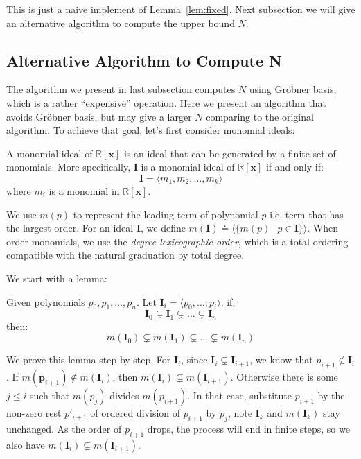 \documentclass{jssc}
\begin{document}
This is just a naive implement of Lemma~\ref{lem:fixed}. Next subsection we will give an alternative algorithm to compute the upper bound $N$.

\subsection{Alternative Algorithm to Compute N}
\label{sub:alternative}
The algorithm we present in last subsection computes $N$ using Gr\"{o}bner basis, which is a rather ``expensive'' operation. Here we present an algorithm that avoids Gr\"{o}bner basis, but may give a larger $N$ comparing to the original algorithm. To achieve that goal, let's first consider monomial ideals:

\begin{definition}
\label{def:monomialIdeal}
A monomial ideal of $\mathbb{R}[\boldsymbol{x}]$ is an ideal that can be generated by a finite set of monomials. More specifically, $\boldsymbol{I}$ is a monomial ideal of $\mathbb{R}[\boldsymbol{x}]$ if and only if:
\begin{displaymath}
	\boldsymbol{I} = \langle m_1, m_2, \dots, m_k \rangle
\end{displaymath}
where $m_i$ is a monomial in $\mathbb{R}[\boldsymbol{x}]$.
\end{definition}

We use $m(p)$ to represent the leading term of polynomial $p$ i.e. term that has the largest order. For an ideal $\boldsymbol{I}$, we define $m(\boldsymbol{I}) \doteq \langle \{m(p)\ |\ p \in \boldsymbol{I} \} \rangle$. When order monomials, we use the \emph{degree-lexicographic order}, which is a total ordering compatible with the natural graduation by total degree.

We start with a lemma:

\begin{lemma}
\label{lem:monomialChain}
Given polynomials $p_0, p_1, \dots, p_n$. Let $\boldsymbol{I}_i = \langle p_0, \dots, p_i \rangle$. if:
	\begin{equation*}
		\boldsymbol{I}_0 \subsetneq \boldsymbol{I}_1 \subsetneq \dots \subsetneq \boldsymbol{I}_n
	\end{equation*}
then:
	\begin{equation*}
		m(\boldsymbol{I}_0) \subsetneq m(\boldsymbol{I}_1) \subsetneq \dots \subsetneq m(\boldsymbol{I}_n)
	\end{equation*}
\end{lemma}

\proof
We prove this lemma step by step. For $\boldsymbol{I}_i$, since $\boldsymbol{I}_i \subsetneq \boldsymbol{I}_{i+1}$, we know that $p_{i+1} \notin \boldsymbol{I}_i$. If $m(\boldsymbol{p}_{i+1}) \notin m(\boldsymbol{I}_i)$, then $m(\boldsymbol{I}_i) \subsetneq m(\boldsymbol{I}_{i+1})$. Otherwise there is some $j \leq i$ such that $m(p_j)$ divides $m(p_{i+1})$. In that case, substitute $p_{i+1}$ by the non-zero rest $p'_{i+1}$ of ordered division of $p_{i+1}$ by $p_j$, note $\boldsymbol{I}_k$ and $m(\boldsymbol{I}_k)$ stay unchanged. As the order of $p_{i+1}$ drops, the process will end in finite steps, so we also have $m(\boldsymbol{I}_i) \subsetneq m(\boldsymbol{I}_{i+1})$.
\end{document}
